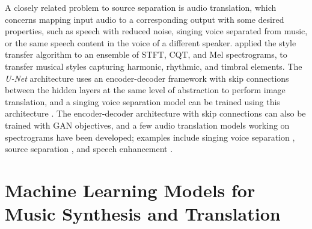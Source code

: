 A closely related problem to source separation is audio translation, which concerns mapping input audio to a corresponding output with some desired properties, such as speech with reduced noise, singing voice separated from music, or the same speech content in the voice of a different speaker.
 applied the style transfer algorithm \cite{gatys2015style} to an ensemble of STFT, CQT, and Mel spectrograms, to transfer musical styles capturing harmonic, rhythmic, and timbral elements.
The \emph{U-Net} architecture \cite{ronneberger2015unet} uses an encoder-decoder framework with skip connections between the hidden layers at the same level of abstraction to perform image translation, and a singing voice separation model can be trained using this architecture \cite{jansson2017separation}.
The encoder-decoder architecture with skip connections can also be trained with GAN objectives, and a few audio translation models working on spectrograms have been developed; examples include singing voice separation \cite{fan2017svsgan, stoller2017separation}, source separation \cite{subakan2017gan}, and speech enhancement \cite{pascual2017segan, donahue2017segan}.



\section{Machine Learning Models for Music Synthesis and Translation}

